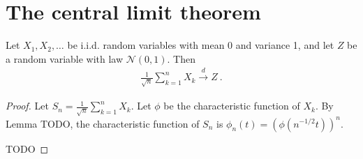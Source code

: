 \chapter{The central limit theorem}

\begin{theorem}\label{clt}
Let $X_1, X_2, \ldots$ be i.i.d. random variables with mean 0 and variance 1, and let $Z$ be a random variable with law $\mathcal N(0,1)$. Then
\begin{align*}
\frac{1}{\sqrt{n}}\sum_{k=1}^n X_k \xrightarrow{d} Z \: .
\end{align*}
\end{theorem}

\begin{proof}
Let $S_n = \frac{1}{\sqrt{n}}\sum_{k=1}^n X_k$. Let $\phi$ be the characteristic function of $X_k$. By Lemma TODO, the characteristic function of $S_n$ is $\phi_n(t) = (\phi(n^{-1/2}t))^n$.

TODO
\end{proof}
